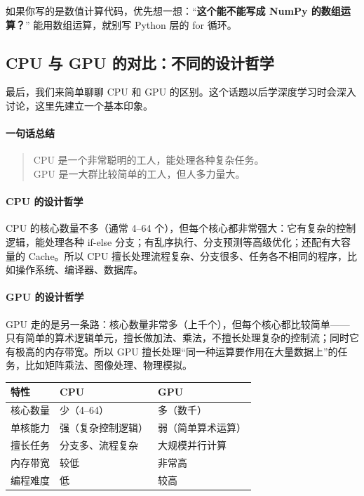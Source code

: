 如果你写的是数值计算代码，优先想一想：“\textbf{这个能不能写成 NumPy 的数组运算？}” 能用数组运算，就别写 Python 层的 for 循环。

\subsection*{CPU 与 GPU 的对比：不同的设计哲学}

最后，我们来简单聊聊 CPU 和 GPU 的区别。这个话题以后学深度学习时会深入讨论，这里先建立一个基本印象。

\paragraph{一句话总结}

\begin{quote}
CPU 是一个非常聪明的工人，能处理各种复杂任务。\\
GPU 是一大群比较简单的工人，但人多力量大。
\end{quote}

\paragraph{CPU 的设计哲学}

CPU 的核心数量不多（通常 4--64 个），但每个核心都非常强大：它有复杂的控制逻辑，能处理各种 if-else 分支；有乱序执行、分支预测等高级优化；还配有大容量的 Cache。所以 CPU 擅长处理流程复杂、分支很多、任务各不相同的程序，比如操作系统、编译器、数据库。

\paragraph{GPU 的设计哲学}

GPU 走的是另一条路：核心数量非常多（上千个），但每个核心都比较简单——只有简单的算术逻辑单元，擅长做加法、乘法，不擅长处理复杂的控制流；同时它有极高的内存带宽。所以 GPU 擅长处理“同一种运算要作用在大量数据上”的任务，比如矩阵乘法、图像处理、物理模拟。

\begin{center}
\renewcommand{\arraystretch}{1.3}
\begin{tabular}{l|l|l}
\toprule
\textbf{特性} & \textbf{CPU} & \textbf{GPU} \\
\midrule
核心数量 & 少（4--64） & 多（数千） \\
单核能力 & 强（复杂控制逻辑） & 弱（简单算术运算） \\
擅长任务 & 分支多、流程复杂 & 大规模并行计算 \\
内存带宽 & 较低 & 非常高 \\
编程难度 & 低 & 较高 \\
\bottomrule
\end{tabular}
\end{center}

